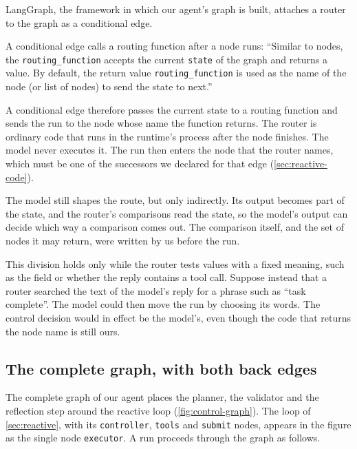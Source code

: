 LangGraph, the framework in which our agent's graph is built, attaches a router to the graph as a
conditional edge.

\begin{definition}
\label{def:control-conditional-edge}
A conditional edge calls a routing function after a node runs: ``Similar to nodes, the
\texttt{routing\_function} accepts the current \texttt{state} of the graph and returns a value. By
default, the return value \texttt{routing\_function} is used as the name of the node (or list of
nodes) to send the state to next.''~\citep{langgraph-graph-api}
\end{definition}

A conditional edge therefore passes the current state to a routing function and sends the run to
the node whose name the function returns. The router is ordinary code that runs in the runtime's
process after the node finishes. The model never executes it. The run then enters the node that the
router names, which must be one of the successors we declared for that edge
(\cref{sec:reactive-code}).

The model still shapes the route, but only indirectly. Its output becomes part of the state, and
the router's comparisons read the state, so the model's output can decide which way a comparison
comes out. The comparison itself, and the set of nodes it may return, were written by us before the
run.

This division holds only while the router tests values with a fixed meaning, such as the
 field or whether the reply contains a tool call. Suppose instead that a router
searched the text of the model's reply for a phrase such as ``task complete''. The model could then
move the run by choosing its words. The control decision would in effect be the model's, even
though the code that returns the node name is still ours.

\subsection{The complete graph, with both back edges}
\label{sec:control-graph}

The complete graph of our agent places the planner, the validator and the reflection step around
the reactive loop (\cref{fig:control-graph}). The loop of \cref{sec:reactive}, with its
\texttt{controller}, \texttt{tools} and \texttt{submit} nodes, appears in the figure as the single
node \texttt{executor}. A run proceeds through the graph as follows.

